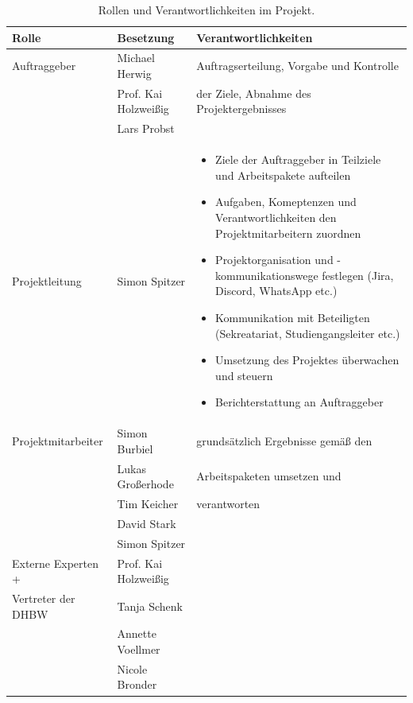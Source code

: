 \begin{table}[H]
    \centering
    \begin{tabular}{|p{3.5cm}|p{4cm}|p{7cm}|}
        \hline
        \textbf{Rolle} & \textbf{Besetzung} & \textbf{Verantwortlichkeiten} \\
        \hline
        Auftraggeber & Michael Herwig & Auftragserteilung, Vorgabe und Kontrolle \\
        & Prof. Kai Holzweißig & der Ziele, Abnahme des Projektergebnisses \\ 
        & Lars Probst & \\
        \hline
        Projektleitung & Simon Spitzer & \begin{itemize}
            \item Ziele der Auftraggeber in Teilziele und Arbeitspakete aufteilen
            \item Aufgaben, Komeptenzen und Verantwortlichkeiten den Projektmitarbeitern zuordnen
            \item Projektorganisation und -kommunikationswege festlegen (Jira, Discord, WhatsApp etc.)
            \item Kommunikation mit Beteiligten (Sekreatariat, Studiengangsleiter etc.)
            \item Umsetzung des Projektes überwachen und steuern
            \item Berichterstattung an Auftraggeber
        \end{itemize} \\
        \hline
        Projektmitarbeiter
        & Simon Burbiel & grundsätzlich Ergebnisse gemäß den \\
        & Lukas Großerhode & Arbeitspaketen umsetzen und \\
        & Tim Keicher & verantworten \\
        & David Stark & \\
        & Simon Spitzer & \\
        \hline
        Externe Experten + & Prof. Kai Holzweißig & \\
        Vertreter der DHBW & Tanja Schenk & \\
        & Annette Voellmer & \\
        & Nicole Bronder & \\
        \hline
    \end{tabular}
    \caption{Rollen und Verantwortlichkeiten im Projekt.}\label{tab:rollen}
\end{table}
